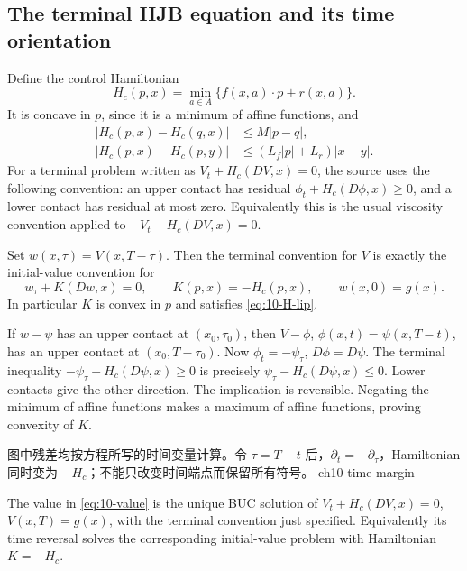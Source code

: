 \Needspace{42mm}

\Needspace{70mm}
\subsection{The terminal HJB equation and its time orientation}
Define the control Hamiltonian
\begin{equation}\label{eq:10-control-H}
 H_c(p,x)=\min_{a\in A}\{f(x,a)\cdot p+r(x,a)\}.
\end{equation}
It is concave in $p$, since it is a minimum of affine functions, and
\[
 \begin{split}
 |H_c(p,x)-H_c(q,x)|&\leq M|p-q|,\\
 |H_c(p,x)-H_c(p,y)|&\leq(L_f|p|+L_r)|x-y|.
 \end{split}
\]
For a terminal problem written as $V_t+H_c(DV,x)=0$, the source
uses the following convention: an upper contact has residual
$\phi_t+H_c(D\phi,x)\geq0$, and a lower contact has residual at most zero.
Equivalently this is the usual viscosity convention applied to
$-V_t-H_c(DV,x)=0$.
\Needspace{50mm}
\begin{lemma}
Set $w(x,\tau)=V(x,T-\tau)$. Then the terminal convention for $V$
is exactly the initial-value convention for
\[
 w_\tau+K(Dw,x)=0,\qquad K(p,x)=-H_c(p,x),\qquad w(x,0)=g(x).
\]
In particular $K$ is convex in $p$ and satisfies \eqref{eq:10-H-lip}.
\end{lemma}
\begin{expandedproof}
If $w-\psi$ has an upper contact at $(x_0,\tau_0)$, then
$V-\phi$, $\phi(x,t)=\psi(x,T-t)$, has an upper contact at
$(x_0,T-\tau_0)$. Now $\phi_t=-\psi_\tau$, $D\phi=D\psi$.
The terminal inequality $-\psi_\tau+H_c(D\psi,x)\geq0$ is precisely
$\psi_\tau-H_c(D\psi,x)\leq0$. Lower contacts give the other direction.
The implication is reversible. Negating the minimum of affine functions
makes a maximum of affine functions, proving convexity of $K$.
\end{expandedproof}
{图中残差均按方程所写的时间变量计算。令 $\tau=T-t$ 后，$\partial_t=-\partial_\tau$，Hamiltonian 同时变为 $-H_c$；不能只改变时间端点而保留所有符号。}
{ch10-time-margin}
\Needspace{55mm}
\begin{theorem}
The value in \eqref{eq:10-value} is the unique BUC solution of
$V_t+H_c(DV,x)=0$, $V(x,T)=g(x)$, with the terminal convention just
specified. Equivalently its time reversal solves the corresponding
initial-value problem with Hamiltonian $K=-H_c$.
\end{theorem}
